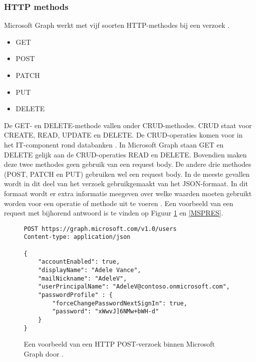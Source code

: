 \subsubsection{HTTP methods}

Microsoft Graph werkt met vijf soorten \Ac{HTTP}-methodes bij een verzoek \autocite{Microsoft2023vv}.

\begin{itemize}
    \item GET
    \item POST
    \item PATCH
    \item PUT
    \item DELETE
\end{itemize}

De GET- en DELETE-methode vallen onder CRUD-methodes. CRUD staat voor CREATE, READ, UPDATE en DELETE. De CRUD-operaties komen voor in het \ac{IT}-component rond databanken \autocite{Truica2015}. In Microsoft Graph staan GET en DELETE gelijk aan de CRUD-operaties READ en DELETE. Bovendien maken deze twee methodes geen gebruik van een request body. De andere drie methodes (POST, PATCH en PUT) gebruiken wel een request body. In de meeste gevallen wordt in dit deel van het verzoek gebruikgemaakt van het \ac{JSON}-formaat. In dit formaat wordt er extra informatie meegeven over welke waarden moeten gebruikt worden voor een operatie of methode uit te voeren \autocite{Microsoft2023vv}. Een voorbeeld van een request met bijhorend antwoord is te vinden op Figuur \ref{MSPR} en \ref{MSPRES}. \\

\begin{figure}[h]
    \scriptsize
    \begin{verbatim}
POST https://graph.microsoft.com/v1.0/users
Content-type: application/json

{
    "accountEnabled": true,
    "displayName": "Adele Vance",
    "mailNickname": "AdeleV",
    "userPrincipalName": "AdeleV@contoso.onmicrosoft.com",
    "passwordProfile" : {
        "forceChangePasswordNextSignIn": true,
        "password": "xWwvJ]6NMw+bWH-d"
    }
}
    \end{verbatim}    
    \caption[Voorbeeld Microsoft Graph POST-verzoek]{Een voorbeeld van een \ac{HTTP} POST-verzoek binnen Microsoft Graph door \textcite{Microsoft2022e}.}
    \label{MSPR}
\end{figure}

